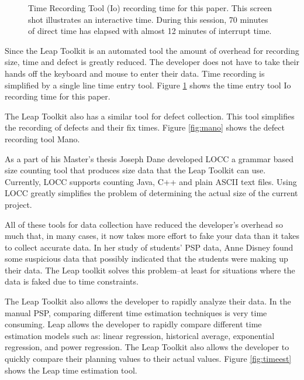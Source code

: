 \begin{figure}[htb]
  \centerline{} 
 \caption{Time Recording Tool (Io) recording time for this paper. This screen
 shot illustrates an interactive time. During this session, 70 minutes of
 direct time has elapsed with almost 12 minutes of interrupt time.}
\label{fig:io}
\end{figure}

Since the Leap Toolkit is an automated tool the amount of overhead for
recording size, time and defect is greatly reduced.  The developer does not
have to take their hands off the keyboard and mouse to enter their data.  Time
recording is simplified by a single line time entry tool. Figure \ref{fig:io}
shows the time entry tool Io recording time for this paper.

The Leap Toolkit also has a similar tool for defect collection.  This tool
simplifies the recording of defects and their fix times.  Figure \ref{fig:mano} 
shows the defect recording tool Mano.

\begin{figure*}[htb]
  \centerline{} 
 \caption{Defect Recording Tool (Mano) recording a simple syntax error found in 
 a draft of this paper.}
\label{fig:mano}
\end{figure*}

As a part of his Master's thesis Joseph Dane developed LOCC\cite{Dane99} a
grammar based size counting tool that produces size data that the Leap Toolkit
can use.  Currently, LOCC supports counting Java, C++ and plain ASCII text
files. Using LOCC greatly simplifies the problem of determining the actual size
of the current project.

All of these tools for data collection have reduced the developer's overhead so
much that, in many cases, it now takes more effort to fake your data than it
takes to collect accurate data.  In her study of students' PSP data, Anne
Disney found some suspicious data that possibly indicated that the students
were making up their data. The Leap toolkit solves this problem--at least for
situations where the data is faked due to time constraints.

The Leap Toolkit also allows the developer to rapidly analyze their data.  In
the manual PSP, comparing different time estimation techniques is very time
consuming.  Leap allows the developer to rapidly compare different time
estimation models such as: linear regression, historical average, exponential
regression, and power regression.  The Leap Toolkit also allows the developer
to quickly compare their planning values to their actual values. Figure
\ref{fig:timeest} shows the Leap time estimation tool.
\begin{center}
  \begin{figure*}[htb]
    \centerline{} 
    \caption{Time Estimation Tool with the author's Java development
    data. Showing the different time trend line options.}
    \label{fig:timeest}
  \end{figure*}
\end{center}

